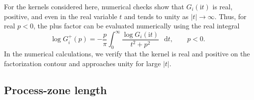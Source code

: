 \documentclass[pdflatex,iicol,sn-mathphys-ay]{sn-jnl}
\newcommand{\dd}{\mathop{}\!\mathrm{d}}
\newcommand{\ii}{\mathrm{i}}
\begin{document}
For the kernels considered here, numerical checks show that
$G_i(\ii t)$ is real, positive, and even in the real variable $t$ and
tends to unity as $|t|\to\infty$.
Thus, for real $p<0$, the plus factor can be evaluated numerically
using the real integral
\begin{equation*}
  \log G_i^+(p)
  =-\frac{p}{\pi}\int_0^\infty
    \frac{\log G_i(\ii t)}{t^2+p^2}\,\dd t,
  \qquad p<0.
\end{equation*}
In the numerical calculations, we verify that the kernel is real and
positive on the factorization contour and approaches unity for large
$|t|$.

\subsection{Process-zone length}
\label{subsec:zone-length}
\end{document}

